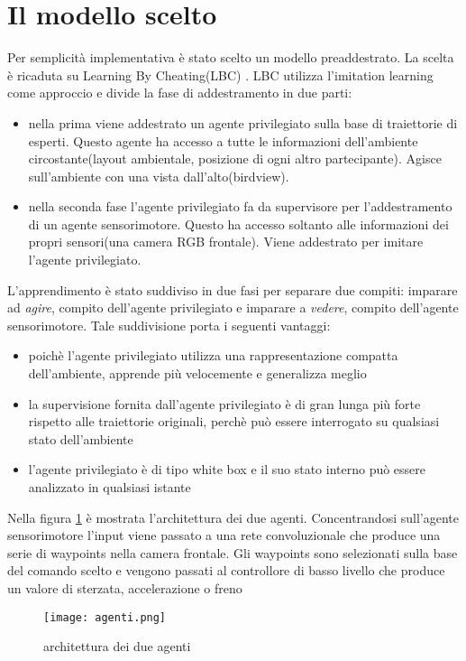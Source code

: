 \section{Il modello scelto}
Per semplicità implementativa è stato scelto un modello preaddestrato. La scelta è ricaduta su Learning By Cheating(LBC) \cite{lbc}. LBC utilizza l'imitation learning come
approccio e divide la fase di addestramento in due parti: \begin{itemize}
    \item nella prima viene addestrato un agente privilegiato sulla base di traiettorie di esperti. Questo agente ha accesso a tutte le informazioni 
    dell'ambiente circostante(layout ambientale, posizione di ogni altro partecipante). Agisce sull'ambiente con una vista dall'alto(birdview).
    \item nella seconda fase l'agente privilegiato fa da supervisore per l'addestramento di un agente sensorimotore. Questo ha accesso soltanto alle informazioni dei
    propri sensori(una camera RGB frontale). Viene addestrato per imitare l'agente privilegiato.
\end{itemize}
L'apprendimento è stato suddiviso in due fasi per separare due compiti: imparare ad \emph{agire}, compito dell'agente privilegiato e imparare a \emph{vedere}, compito dell'agente sensorimotore.
Tale suddivisione porta i seguenti vantaggi:\begin{itemize}
    \item poichè l'agente privilegiato utilizza una rappresentazione compatta dell'ambiente, apprende più velocemente e generalizza meglio
    \item la supervisione fornita dall'agente privilegiato è di gran lunga più forte rispetto alle traiettorie originali, perchè può essere interrogato 
    su qualsiasi stato dell'ambiente
    \item l'agente privilegiato è di tipo white box e il suo stato interno può essere analizzato in qualsiasi istante
\end{itemize}
Nella figura \ref{fig:arch} è mostrata l'architettura dei due agenti. Concentrandosi sull'agente sensorimotore  l'input viene passato a una rete convoluzionale che produce una serie di 
waypoints nella camera frontale. Gli waypoints  sono selezionati sulla base del comando scelto e vengono passati al controllore di basso livello che produce un valore di sterzata, accelerazione o freno
\begin{figure}[h!]
    \texttt{[image: agenti.png]}
    \caption{architettura dei due agenti\cite{lbc}}
    \label{fig:arch}
\end{figure}
